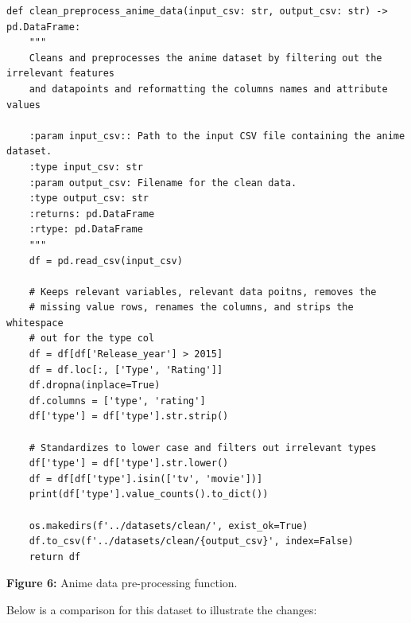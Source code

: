 \begin{verbatim}
def clean_preprocess_anime_data(input_csv: str, output_csv: str) -> pd.DataFrame:
    """
    Cleans and preprocesses the anime dataset by filtering out the irrelevant features
    and datapoints and reformatting the columns names and attribute values

    :param input_csv:: Path to the input CSV file containing the anime dataset.
    :type input_csv: str
    :param output_csv: Filename for the clean data.
    :type output_csv: str
    :returns: pd.DataFrame
    :rtype: pd.DataFrame
    """
    df = pd.read_csv(input_csv)

    # Keeps relevant variables, relevant data poitns, removes the
    # missing value rows, renames the columns, and strips the whitespace
    # out for the type col
    df = df[df['Release_year'] > 2015]
    df = df.loc[:, ['Type', 'Rating']]
    df.dropna(inplace=True)
    df.columns = ['type', 'rating']
    df['type'] = df['type'].str.strip()

    # Standardizes to lower case and filters out irrelevant types
    df['type'] = df['type'].str.lower()
    df = df[df['type'].isin(['tv', 'movie'])]
    print(df['type'].value_counts().to_dict())

    os.makedirs(f'../datasets/clean/', exist_ok=True)
    df.to_csv(f'../datasets/clean/{output_csv}', index=False)
    return df
\end{verbatim}

\begin{center}
\textbf{Figure 6:} Anime data pre-processing function.
\end{center}

Below is a comparison for this dataset to illustrate the changes:\\

